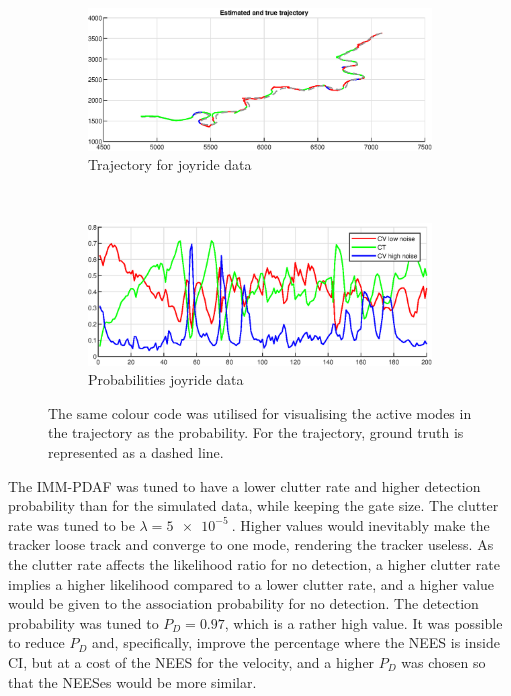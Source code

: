 \begin{figure}[ht]
    \begin{subfigure}[h]{0.4\textwidth}
        \includegraphics[width=\textwidth]{figures/ga_1/joyride_estimated_trajectory}
        \caption{Trajectory for joyride data}
        \label{fig:ga_1_joyride_estimated_trajectory}
    \end{subfigure}%
    ~
    \begin{subfigure}[h]{0.4\textwidth}
        \includegraphics[width=\textwidth]{figures/ga_1/joyride_probs}
        \caption{Probabilities joyride data}
        \label{fig:ga_1_joyride_probabilities}
    \end{subfigure}
    \caption{The same colour code was utilised for visualising the active modes in the trajectory as the probability. For the trajectory, ground truth is represented as a dashed line. }
    \label{fig:ga_1_joyride_traj_and_probs} 
\end{figure}

The IMM-PDAF was tuned to have a lower clutter rate and higher detection probability than for the simulated data, while keeping the gate size. The clutter rate was tuned to be $\lambda = \SI{5e-5}{}$. Higher values would inevitably make the tracker loose track and converge to one mode, rendering the tracker useless. As the clutter rate affects the likelihood ratio for no detection, a higher clutter rate implies a higher likelihood compared to a lower clutter rate, and a higher value would be given to the association probability for no detection. The detection probability was tuned to $P_D = 0.97$, which is a rather high value. It was possible to reduce $P_D$ and, specifically, improve the percentage where the NEES is inside CI, but at a cost of the NEES for the velocity, and a higher $P_D$ was chosen so that the NEESes would be more similar. 

